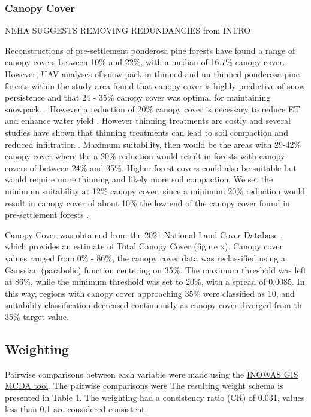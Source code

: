 \documentclass[
  number,
  preprint,
  3p,
  onecolumn]{elsarticle}
\begin{document}
\subsubsection{Canopy Cover}\label{canopy-cover}

NEHA SUGGESTS REMOVING REDUNDANCIES from INTRO

Reconstructions of pre-settlement ponderosa pine forests have found a
range of canopy covers between 10\% and 22\%, with a median of 16.7\%
canopy cover\citep{huffman2012}. However, UAV-analyses of snow pack in
thinned and un-thinned ponderosa pine forests within the study area
found that canopy cover is highly predictive of snow persistence and
that 24 - 35\% canopy cover was optimal for maintaining snowpack.
\citep{donager2021, sankey_multi-scale_2015, belmonte_uav-based_2021}.
However a reduction of 20\% canopy cover is necessary to reduce ET and
enhance water yield \citep{adams_ecohydrological_2012} . However
thinning treatments are costly and several studies have shown that
thinning treatments can lead to soil compaction and reduced infiltration
\citep{moreno2016}. Maximum suitability, then would be the areas with
29-42\% canopy cover where the a 20\% reduction would result in forests
with canopy covers of between 24\% and 35\%. Higher forest covers could
also be suitable but would require more thinning and likely more soil
compaction. We set the minimum suitability at 12\% canopy cover, since a
minimum 20\% reduction would result in canopy cover of about 10\% the
low end of the canopy cover found in pre-settlement forests
\citep{huffman2012}.

Canopy Cover was obtained from the 2021 National Land Cover Database ,
which provides an estimate of Total Canopy Cover (figure x). Canopy
cover values ranged from 0\% - 86\%, the canopy cover data was
reclassified using a Gaussian (parabolic) function centering on 35\%.
The maximum threshold was left at 86\%, while the minimum threshold was
set to 20\%, with a spread of 0.0085. In this way, regions with canopy
cover approaching 35\% were classified as 10, and suitability
classification decreased continuously as canopy cover diverged from th
35\% target value.

\subsection{Weighting}\label{weighting}

Pairwise comparisons between each variable were made using the
\href{https://www.inowas.com/tools/t05-gis-mcda/}{INOWAS GIS MCDA tool}.
The pairwise comparisons were The resulting weight schema is presented
in Table 1. The weighting had a consistency ratio (CR) of 0.031, values
less than 0.1 are considered consistent.
\end{document}
